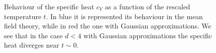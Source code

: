 \documentclass[../../Main/Main.tex]{subfiles}
\begin{document}
\begin{figure}[H]
\begin{minipage}[c]{0.5\linewidth}
\end{minipage}
\begin{minipage}[]{0.5\linewidth}
\centering
{}
\end{minipage}
\caption{\label{fig:} Behaviour of the specific heat \( c_V \) as a function of the rescaled temperature \( t \). In blue it is represented its behaviour in the mean field theory, while in red the one with Gaussian approximations. We see that in the case \( d<4 \) with Gaussian approximations the specific heat diverges near \( t \sim 0 \). }
\end{figure}
\end{document}
